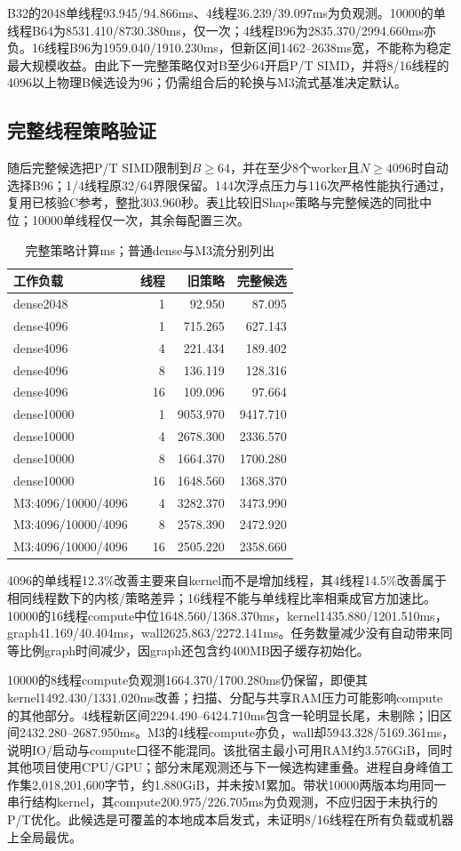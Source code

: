 \documentclass[UTF8,a4paper,11pt]{ctexart}
\begin{document}
B32的2048单线程93.945/94.866ms、4线程36.239/39.097ms为负观测。10000的单线程B64为8531.410/8730.380ms，仅一次；4线程B96为2835.370/2994.660ms亦负。16线程B96为1959.040/1910.230ms，但新区间1462--2638ms宽，不能称为稳定最大规模收益。由此下一完整策略仅对B至少64开启P/T SIMD，并将8/16线程的4096以上物理B候选设为96；仍需组合后的轮换与M3流式基准决定默认。

\subsection{完整线程策略验证}
随后完整候选把P/T SIMD限制到$B\geq64$，并在至少8个worker且$N\geq4096$时自动选择B96；1/4线程原32/64界限保留。144次浮点压力与116次严格性能执行通过，复用已核验C参考，整批303.960秒。表\ref{tab:thread-policy}比较旧Shape策略与完整候选的同批中位；10000单线程仅一次，其余每配置三次。
\begin{table}[htbp]\centering\small
\caption{完整策略计算ms；普通dense与M3流分别列出}\label{tab:thread-policy}
\begin{tabular}{@{}lrrr@{}}\toprule
工作负载&线程&旧策略&完整候选\\\midrule
dense2048&1&92.950&87.095\\
dense4096&1&715.265&627.143\\
dense4096&4&221.434&189.402\\
dense4096&8&136.119&128.316\\
dense4096&16&109.096&97.664\\
dense10000&1&9053.970&9417.710\\
dense10000&4&2678.300&2336.570\\
dense10000&8&1664.370&1700.280\\
dense10000&16&1648.560&1368.370\\
M3:4096/10000/4096&4&3282.370&3473.990\\
M3:4096/10000/4096&8&2578.390&2472.920\\
M3:4096/10000/4096&16&2505.220&2358.660\\\bottomrule
\end{tabular}\end{table}
4096的单线程12.3\%改善主要来自kernel而不是增加线程，其4线程14.5\%改善属于相同线程数下的内核/策略差异；16线程不能与单线程比率相乘成官方加速比。10000的16线程compute中位1648.560/1368.370ms，kernel1435.880/1201.510ms，graph41.169/40.404ms，wall2625.863/2272.141ms。任务数量减少没有自动带来同等比例graph时间减少，因graph还包含约400MB因子缓存初始化。

10000的8线程compute负观测1664.370/\allowbreak{}1700.280ms仍保留，即便其kernel1492.430/\allowbreak{}1331.020ms改善；扫描、分配与共享RAM压力可能影响compute的其他部分。4线程新区间2294.490--6424.710ms包含一轮明显长尾，未剔除；旧区间2432.280--2687.950ms。M3的4线程compute亦负，wall却5943.328/\allowbreak{}5169.361ms，说明IO/启动与compute口径不能混同。该批宿主最小可用RAM约3.576GiB，同时其他项目使用CPU/GPU；部分末尾观测还与下一候选构建重叠。进程自身峰值工作集2,018,201,600字节，约1.880GiB，并未按M累加。带状10000两版本均用同一串行结构kernel，其compute200.975/\allowbreak{}226.705ms为负观测，不应归因于未执行的P/T优化。此候选是可覆盖的本地成本启发式，未证明8/\allowbreak{}16线程在所有负载或机器上全局最优。
\end{document}
